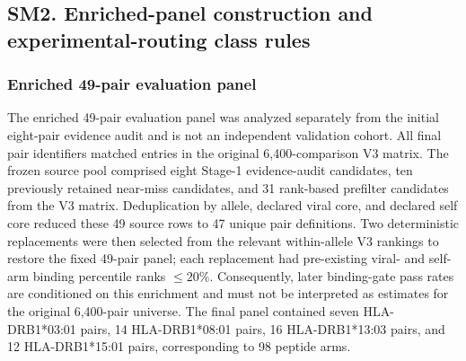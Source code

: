 \documentclass[11pt]{article}
\begin{document}
\subsection{SM2. Enriched-panel construction and experimental-routing class rules}
\subsubsection{Enriched 49-pair evaluation panel}
The enriched 49-pair evaluation panel was analyzed separately from the initial eight-pair evidence audit and is not an independent validation cohort. All final pair identifiers matched entries in the original 6,400-comparison V3 matrix. The frozen source pool comprised eight Stage-1 evidence-audit candidates, ten previously retained near-miss candidates, and 31 rank-based prefilter candidates from the V3 matrix. Deduplication by allele, declared viral core, and declared self core reduced these 49 source rows to 47 unique pair definitions. Two deterministic replacements were then selected from the relevant within-allele V3 rankings to restore the fixed 49-pair panel; each replacement had pre-existing viral- and self-arm binding percentile ranks $\leq20\%$. Consequently, later binding-gate pass rates are conditioned on this enrichment and must not be interpreted as estimates for the original 6,400-pair universe. The final panel contained seven HLA-DRB1*03:01 pairs, 14 HLA-DRB1*08:01 pairs, 16 HLA-DRB1*13:03 pairs, and 12 HLA-DRB1*15:01 pairs, corresponding to 98 peptide arms.
\end{document}
